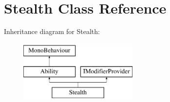 \hypertarget{class_stealth}{}\section{Stealth Class Reference}
\label{class_stealth}
Inheritance diagram for Stealth\+:\begin{figure}[H]
\begin{center}
\leavevmode
\includegraphics[height=3.000000cm]{class_stealth}
\end{center}
\end{figure}
